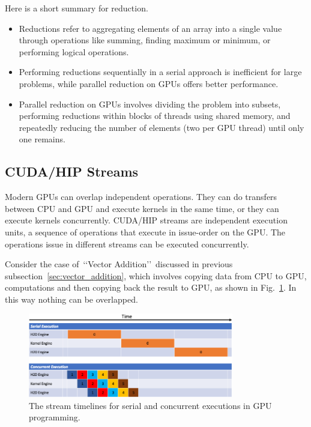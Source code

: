 \par
Here is a short summary for reduction.
\begin{itemize}
    \item Reductions refer to aggregating elements of an array into a single value through operations like summing, finding maximum or minimum, or performing logical operations.
    \item Performing reductions sequentially in a serial approach is inefficient for large problems, while parallel reduction on GPUs offers better performance.
    \item Parallel reduction on GPUs involves dividing the problem into subsets, performing reductions within blocks of threads using shared memory, and repeatedly reducing the number of elements (two per GPU thread) until only one remains.
\end{itemize}




\subsection{CUDA/HIP Streams}


\par
Modern GPUs can overlap independent operations.
They can do transfers between CPU and GPU and execute kernels in the same time, or they can execute kernels concurrently.
CUDA/HIP streams are independent execution units, a sequence of operations that execute in issue-order on the GPU.
The operations issue in different streams can be executed concurrently.


\par
Consider the case of~\lq\lq Vector Addition\rq\rq~discussed in previous subsection~\ref{sec:vector_addition}, which involves copying data from CPU to GPU, computations and then copying back the result to GPU, as shown in Fig.~\ref{fig:streams_timeline}.
In this way nothing can be overlapped.


\begin{figure}[htbp]
\centering\includegraphics[width=0.8\textwidth]{fig_problem/streams_timeline.png}
\caption{The stream timelines for serial and concurrent executions in GPU programming.}\label{fig:streams_timeline}
\end{figure}


